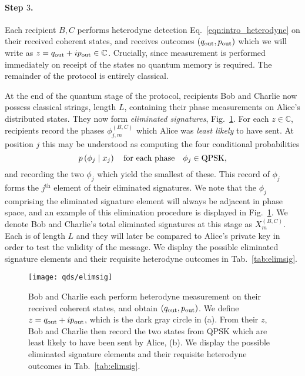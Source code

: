 \paragraph{Step $3$.}
Each recipient $B, C$ performs heterodyne detection Eq.~\ref{eqn:intro_heterodyne} on their received coherent states, and receives outcomes $\left( q_{\text{out}}, p_{\text{out}} \right)$ which we will write as $z = q_{\text{out}} + i p_{\text{out}} \in \mathbb{C}$. Crucially, since measurement is performed immediately on receipt of the states no quantum memory is required. The remainder of the protocol is entirely classical.


At the end of the quantum stage of the protocol, recipients Bob and Charlie now possess classical strings, length $L$, containing their phase measurements on Alice's distributed states. They now form \emph{eliminated signatures}, Fig.~\ref{fig:elimsig}. For each $z \in\mathbb{C}$, recipients record the phases $\phi_{j, m}^{\left(B, C\right)}$ which Alice was \emph{least likely} to have sent. At position $j$ this may be understood as computing the four conditional probabilities 
\begin{equation}
p\left(\phi_j \given x_j\right) \qq{for each phase} \phi_j \in \text{QPSK},
\end{equation}
and recording the two $\phi_j$ which yield the smallest of these. This record of $\phi_j$ forms the $j^{\text{th}}$ element of their eliminated signatures. We note that the $\phi_j$ comprising the eliminated signature element will always be adjacent in phase space, and an example of this elimination procedure is displayed in Fig.~\ref{fig:elimsig}. We denote Bob and Charlie's total eliminated signatures at this stage as $X_m^{\left(B, C\right)}$. Each is of length $L$ and they will later be compared to Alice's private key in order to test the validity of the message. We display the possible eliminated signature elements and their requisite heterodyne outcomes in Tab.~\ref{tab:elimsig}.

\begin{figure}[htp]
\captionsetup{width=0.8\linewidth}
\centering
\texttt{[image: qds/elimsig]}
\caption{\label{fig:elimsig} Bob and Charlie each perform heterodyne measurement on their received coherent states, and obtain $\left(q_{\text{out}}, p_{\text{out}}\right)$. We define $z = q_{\text{out}} + i p_{\text{out}}$, which is the dark gray circle in (a). From their $z$, Bob and Charlie then record the two states from QPSK which are least likely to have been sent by Alice, (b). We display the possible eliminated signature elements and their requisite heterodyne outcomes in Tab.~\ref{tab:elimsig}.}
\end{figure}


